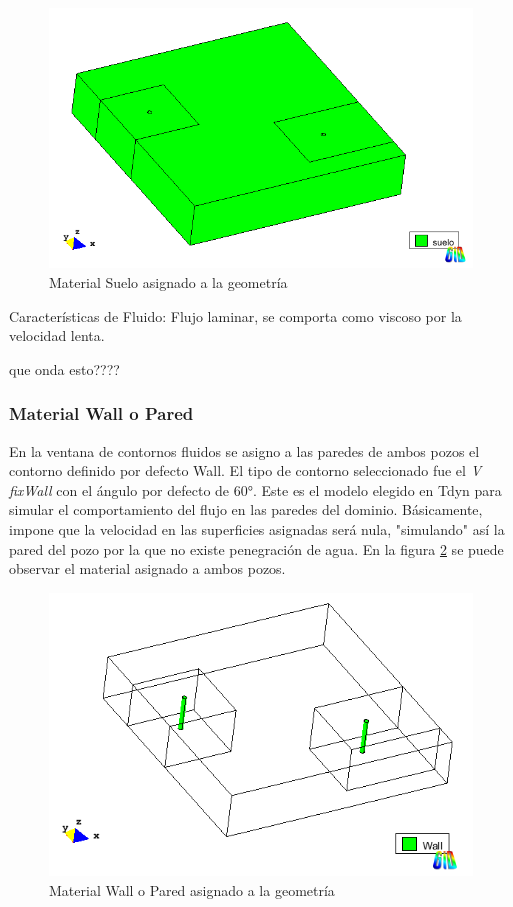 \documentclass[10pt,a4paper,final]{article}
\begin{document}
\begin{figure}[tbhp]
\centerline{\includegraphics[scale=0.75]{img/datos_materiales_suelo_vista}}
\caption{Material Suelo asignado a la geometría}
\label{datos_materiales_suelo_vista}
\end{figure}

Características de Fluido: Flujo laminar, se comporta como viscoso por la velocidad lenta. \begin{LARGE}
que onda esto????
\end{LARGE} 
%
\subsubsection{Material Wall o Pared}
En la ventana de contornos fluidos se asigno a las paredes de ambos pozos el contorno definido por defecto Wall. El tipo de contorno seleccionado fue el \emph{V fixWall} con el ángulo por defecto de $60°$. Este es el modelo elegido en Tdyn para simular el comportamiento del flujo en las paredes del dominio. Básicamente, impone que la velocidad en las superficies asignadas será nula, "simulando" así la pared del pozo por la que no existe penegración de agua. En la figura \ref{datos_contornos_fluidos_vista} se puede observar el material asignado a ambos pozos.
\begin{figure}[tbhp]
\centerline{\includegraphics[scale=0.75]{img/datos_contornos_fluidos_vista}}
\caption{Material Wall o Pared asignado a la geometría}
\label{datos_contornos_fluidos_vista}
\end{figure}
\end{document}
